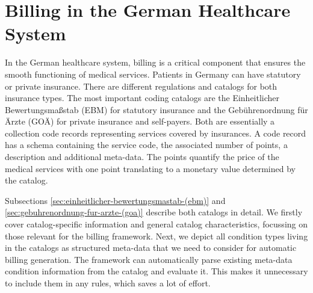 \chapter{Billing in the German Healthcare System}\label{ch:billing-in-the-german-healthcare-system}

In the German healthcare system, billing is a critical component that ensures the smooth functioning of medical services.
Patients in Germany can have statutory or private insurance.
There are different regulations and catalogs for both insurance types.
The most important coding catalogs are the Einheitlicher Bewertungsmaßstab (EBM) for statutory insurance and the Gebührenordnung für Ärzte (GOÄ) for private insurance and self-payers.
Both are essentially a collection code records representing services covered by insurances.
A code record has a schema containing the service code, the associated number of points, a description and additional meta-data.
The points quantify the price of the medical services with one point translating to a monetary value determined by the catalog.

Subsections \ref{sec:einheitlicher-bewertungsmastab-(ebm)} and \ref{sec:gebuhrenordnung-fur-arzte-(goa)} describe both catalogs in detail.
We firstly cover catalog-specific information and general catalog characteristics, focussing on those relevant for the billing framework.
Next, we depict all condition types living in the catalogs as structured meta-data that we need to consider for automatic billing generation.
The framework can automatically parse existing meta-data condition information from the catalog and evaluate it.
This makes it unnecessary to include them in any rules, which saves a lot of effort.



